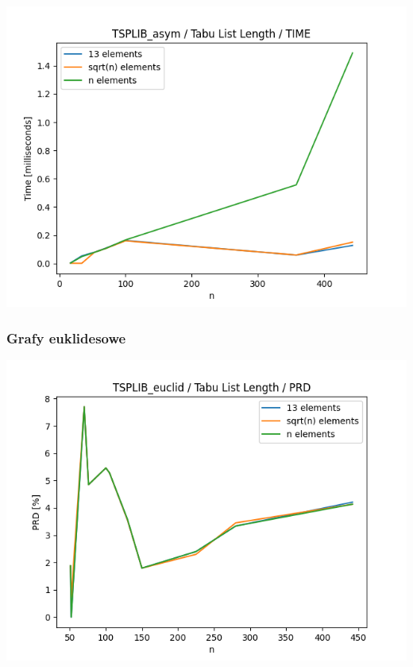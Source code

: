 \documentclass{article}
\begin{document}
\begin{center}
\includegraphics[width=\textwidth, 
                   height = 0.4\textheight, 
                   keepaspectratio]
                  {plots/tabu_tsplib_asym_time} 
\end{center}

\subsubsection{Grafy euklidesowe}

\begin{center}
\includegraphics[width=\textwidth, 
                   height = 0.4\textheight, 
                   keepaspectratio]
                  {plots/tabu_tsplib_euclid_prd} 
\end{center}
\end{document}
